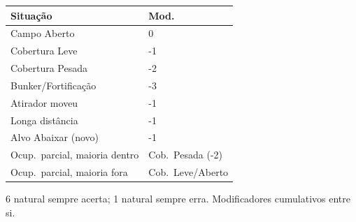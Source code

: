\documentclass[10pt]{article}
\begin{document}
\begin{cardpage}
{\begin{tabular}{@{}p{3.4cm}p{2.4cm}@{}}
\toprule
\textbf{Situação} & \textbf{Mod.}\\
\midrule
Campo Aberto & 0\\
Cobertura Leve & -1\\
Cobertura Pesada & -2\\
Bunker/Fortificação & -3\\
Atirador moveu & -1\\
Longa distância & -1\\
Alvo Abaixar (novo) & -1\\
Ocup.\ parcial, maioria dentro & Cob.\ Pesada (-2)\\
Ocup.\ parcial, maioria fora & Cob.\ Leve/Aberto\\
\bottomrule
\end{tabular}

\vspace{3pt}
6 natural sempre acerta; 1 natural sempre erra. Modificadores cumulativos entre si.
}

\end{cardpage}
\end{document}
